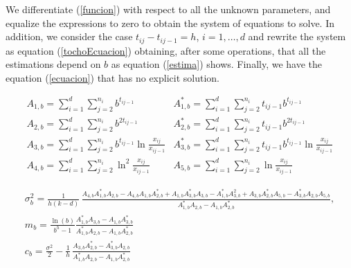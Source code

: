 \documentclass{sig-alternate}
\begin{document}
We differentiate (\ref{funcion}) with respect to all the unknown parameters, and equalize the expressions to zero to obtain the system of equations to solve. In addition, we consider the case $t_{ij}-t_{ij-1}=h$, $i=1,\ldots,d$ and rewrite the system as equation (\ref{tochoEcuacion}) obtaining, after some operations, that all the estimations depend on $b$ as equation (\ref{estima}) shows. Finally, we have the equation (\ref{ecuacion}) that has no explicit solution.



\begin{figure*}[htb]
\begin{eqnarray}
    A_{1,b}=\displaystyle\sum_{i=1}^{d}\displaystyle\sum_{j=2}^{n_i}b^{t_{ij-1}}&
    A^*_{1,b}=\displaystyle\sum_{i=1}^{d}\displaystyle\sum_{j=2}^{n_i}t_{ij-1}b^{t_{ij-1}} \label{tochoEcuacion}
\\
    A_{2,b}=\displaystyle\sum_{i=1}^{d}\displaystyle\sum_{j=2}^{n_i}b^{2t_{ij-1}}&
    A^*_{2,b}=\displaystyle\sum_{i=1}^{d}\displaystyle\sum_{j=2}^{n_i}t_{ij-1}b^{2t_{ij-1}}\nonumber\\
    A_{3,b}=\displaystyle\sum_{i=1}^{d}\displaystyle\sum_{j=2}^{n_i}b^{t_{ij-1}}
    \ln\displaystyle\frac{x_{ij}}{x_{ij-1}} &
    A^*_{3,b}=\displaystyle\sum_{i=1}^{d}\displaystyle\sum_{j=2}^{n_i}t_{ij-1}b^{t_{ij-1}}
  \ln\displaystyle\frac{x_{ij}}{x_{ij-1}}\nonumber\\
  A_{4,b}=\displaystyle\sum_{i=1}^{d}\displaystyle\sum_{j=2}^{n_i}\ln^2\displaystyle\frac{x_{ij}}{x_{ij-1}} & A_{5,b}=\displaystyle\sum_{i=1}^{d}\displaystyle\sum_{j=2}^{n_i}\ln\displaystyle\frac{x_{ij}}{x_{ij-1}}\nonumber
\end{eqnarray}
\end{figure*}



\begin{figure*}[htb]
\begin{eqnarray}
\sigma_b^2=\frac{1}{h(k-d)}\,\frac{A_{4,b}A^*_{1,b}A_{2,b}-A_{4,b}A_{1,b}A^*_{2,b}+A_{1,b}A^*_{3,b}A_{3,b}-A^*_{1,b}A^2_{3,b}+
    A_{3,b}A^*_{2,b}A_{5,b}-A^*_{3,b}A_{2,b}A_{5,b}}{A^*_{1,b}A_{2,b}-A_{1,b}A^*_{2,b}},\label{estima}\\
    m_b= \frac{\ln(b)}{b^h-1}\frac{A^*_{1,b}A_{3,b}- A_{1,b}A^*_{3,b}}{A^*_{1,b}A_{2,b}-A_{1,b}A^*_{2,b}}\nonumber\\
    c_b=\frac{\sigma^2}{2}-\frac{1}{h}\,\frac{A_{3,b}A^*_{2,b}-A^*_{3,b}A_{2,b}}{A^*_{1,b}A_{2,b}-A_{1,b}A^*_{2,b}}\nonumber
\end{eqnarray}
\end{figure*}
\end{document}
